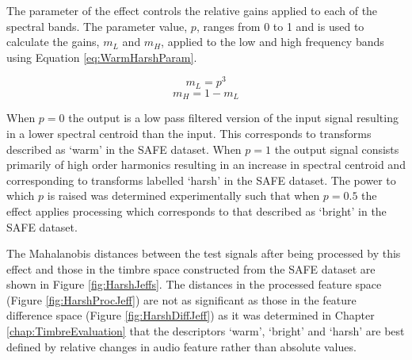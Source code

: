 			The parameter of the effect controls the relative gains applied to each of the spectral bands. The
			parameter value, $p$, ranges from 0 to 1 and is used to calculate the gains, $m_{L}$ and $m_{H}$,
			applied to the low and high frequency bands using Equation \ref{eq:WarmHarshParam}.

			\[ m_{L} = p^{3} \]
			\begin{equation}
				m_{H} = 1 - m_{L}
				\label{eq:WarmHarshParam}
			\end{equation}

			When $p = 0$  the output is a low pass filtered version of the input signal resulting in a lower
			spectral centroid than the input. This corresponds to transforms  described as `warm' in the SAFE
			dataset. When $p = 1$ the output signal consists primarily of high order harmonics resulting in an
			increase in spectral centroid and corresponding to transforms labelled `harsh' in the SAFE dataset.
			The power to which $p$ is raised was determined experimentally such that when $p = 0.5$ the effect
			applies processing which corresponds to that described as `bright' in the SAFE dataset. 

			The Mahalanobis distances between the test signals after being processed by this effect and those in
			the timbre space constructed from the SAFE dataset are shown in Figure \ref{fig:HarshJeffs}. The
			distances in the processed feature space (Figure \ref{fig:HarshProcJeff}) are not as significant as
			those in the feature difference space (Figure \ref{fig:HarshDiffJeff}) as it was determined in
			Chapter \ref{chap:TimbreEvaluation} that the descriptors `warm', `bright' and `harsh' are best
			defined by relative changes in audio feature rather than absolute values.

